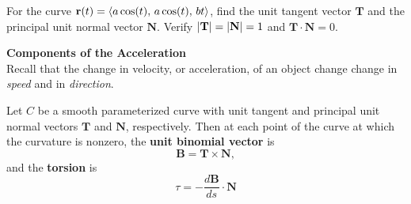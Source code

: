 \documentclass[mathNotesPreamble]{subfiles}
\begin{document}
  \begin{ex*}
    For the curve ${\mathbf{r}}(t)={\left\langle a\cos(t),\,a\cos(t),\,bt \right\rangle}$, find the unit tangent vector $\mathbf T$ and the principal unit normal vector $\mathbf N$. Verify ${\left\vert\mathbf T\right\vert}={\left\vert\mathbf N\right\vert}=1$ and $\mathbf T\cdot\mathbf N=0$.
  \end{ex*}

  \pagebreak

  \textbf{Components of the Acceleration}\\
  Recall that the change in velocity, or acceleration, of an object change change in \textit{speed} and in \textit{direction}. 
  
  \noindent
  \pagebreak

  \begin{defn*}
    Let $C$ be a smooth parameterized curve with unit tangent and principal unit normal vectors $\mathbf T$ and $\mathbf N$, respectively. Then at each point of the curve at which the curvature is nonzero, the \textbf{unit binomial vector} is
      \[\mathbf B=\mathbf T\times\mathbf N,\]
    and the \textbf{torsion} is
      \[\tau=-\frac{d\mathbf B}{ds}\cdot\mathbf N\]
  \end{defn*}

  \noindent

  \pagebreak
  
\end{document}
